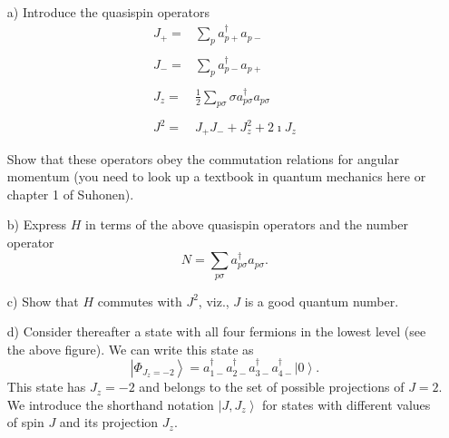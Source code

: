\documentclass[11pt,a4wide]{article}
\newcommand{\ket}[1]{\left| #1 \right\rangle}
\begin{document}
\begin{enumerate}
\item[a)] Introduce the quasispin operators
\[
\begin{array}{ll}
J_{+}=&\sum_{p}
a_{p+}^{\dagger}a_{p-}\\
&\\
J_{-}=&\sum_{p}
a_{p-}^{\dagger}a_{p+}\\
&\\
J_{z}=&\frac{1}{2}\sum_{p\sigma}\sigma
a_{p\sigma}^{\dagger}a_{p\sigma}\\
&\\
J^{2}=&J_{+}J_{-}+J_{z}^{2}+2\imath J_{z}\\
&\\
\end{array}
\]
Show that these operators obey the commutation relations for angular momentum (you need to look up a textbook in quantum mechanics here or chapter 1 of Suhonen).\newline
\item[b)] Express $H$ in terms of the above quasispin operators and the number operator
\[
N=\sum_{p\sigma}
a_{p\sigma}^{\dagger}a_{p\sigma}.
\]
\item[c)] Show that $H$ commutes with $J^{2}$, viz., $J$ is a good quantum number.\newline
\item[d)] Consider thereafter a state with all four fermions in the lowest level (see the above figure).
We can write this state as
\[
\ket{\Phi_{J_z=-2}} =a_{1-}^{\dagger}a_{2-}^{\dagger}
a_{3-}^{\dagger}a_{4-}^{\dagger}\ket{0}.
\]
This state has $J_{z}=-2$ and belongs to the set of possible projections of 
$J=2$. We introduce the shorthand notation
$\ket{J,J_z}$ for states with different values of
spin $J$ and its projection $J_z$.


\end{enumerate}
\end{document}
